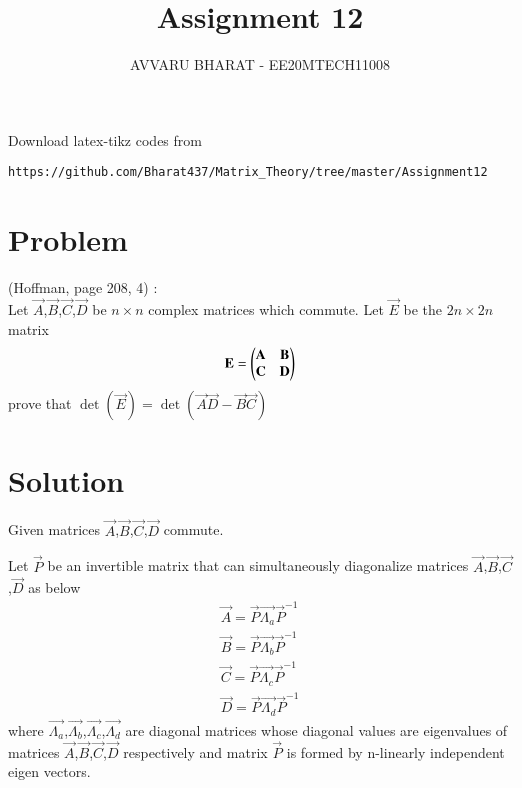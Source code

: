 \documentclass[journal,12pt,twocolumn]{IEEEtran}
\begin{document}
     \def\rightbox#1{\makebox[0in][r]{#1}}
     \def\centbox#1{\makebox[0in]{#1}}
     \def\topbox#1{\raisebox{-\baselineskip}[0in][0in]{#1}}
     \def\midbox#1{\raisebox{-0.5\baselineskip}[0in][0in]{#1}}
\vspace{3cm}
\title{Assignment 12}
\author{AVVARU BHARAT - EE20MTECH11008}
\maketitle
\newpage
\bigskip
\renewcommand{\thefigure}{\theenumi}
\renewcommand{\thetable}{\theenumi}
Download latex-tikz codes from 
%
\begin{lstlisting}
https://github.com/Bharat437/Matrix_Theory/tree/master/Assignment12
\end{lstlisting}
%
\section{Problem}
(Hoffman, page 208, 4) : \\
%
Let $\vec{A}$,$\vec{B}$,$\vec{C}$,$\vec{D}$ be $n\times n$ complex matrices which commute. Let $\vec{E}$ be the $2n\times 2n$ matrix
\begin{align}
    \mathbf{E}=\begin{pmatrix}\mathbf{A} & \mathbf{B}\\\mathbf{C} & \mathbf{D}\end{pmatrix}\label{E}
\end{align}
prove that $\det(\vec{E})=\det(\vec{A}\vec{D}-\vec{B}\vec{C})$
\section{Solution}
Given matrices $\vec{A}$,$\vec{B}$,$\vec{C}$,$\vec{D}$ commute.

Let $\vec{P}$ be an invertible matrix that can simultaneously diagonalize matrices $\vec{A}$,$\vec{B}$,$\vec{C}$,$\vec{D}$ as below
\begin{align}
    \vec{A}=\vec{P}\vec{\Lambda_a}\vec{P}^{-1}\label{A}\\
    \vec{B}=\vec{P}\vec{\Lambda_b}\vec{P}^{-1}\label{B}\\
    \vec{C}=\vec{P}\vec{\Lambda_c}\vec{P}^{-1}\label{C}\\
    \vec{D}=\vec{P}\vec{\Lambda_d}\vec{P}^{-1}\label{D}
\end{align}
where $\vec{\Lambda_a}$,$\vec{\Lambda_b}$,$\vec{\Lambda_c}$,$\vec{\Lambda_d}$ are diagonal matrices whose diagonal values are eigenvalues of matrices $\vec{A}$,$\vec{B}$,$\vec{C}$,$\vec{D}$ respectively and matrix $\vec{P}$ is formed by n-linearly independent eigen vectors.
\end{document}
